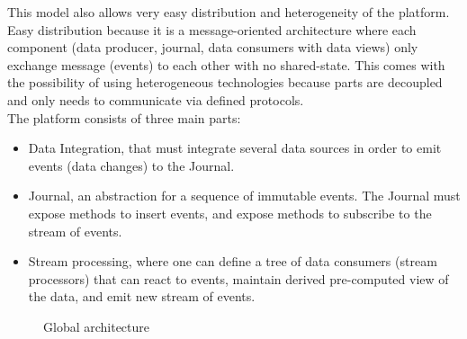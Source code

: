 This model also allows very easy distribution and heterogeneity of the platform. Easy distribution because it is a message-oriented
architecture where each component (data producer, journal, data consumers with data views) only exchange message (events) to each other with
no shared-state. This comes with the possibility of using heterogeneous technologies because parts are decoupled and only needs
to communicate via defined protocols.
\\

The platform consists of three main parts: 
\begin{itemize}
  \item Data Integration, that must integrate several data sources in order to emit 
events (data changes) to the Journal. 
  \item Journal, an abstraction for a sequence of immutable events. The Journal must expose methods to insert events,
  and expose methods to subscribe to the stream of events.
  \item Stream processing, where one can define a tree of data consumers (stream processors) that can react to
  events, maintain derived pre-computed view of the data, and emit new stream of events.
\end{itemize}

\begin{figure}[h]
  \begin{center}
    \caption{Global architecture}
    \label{fig:main_archi}
  \end{center}
\end{figure}


